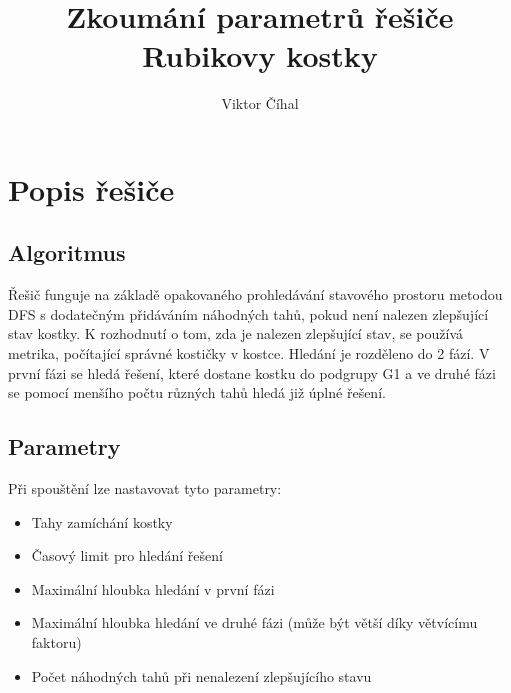 \documentclass{article}
\title{Zkoumání parametrů řešiče Rubikovy kostky}
\author{Viktor Číhal}
\date{}
\begin{document}
\maketitle

\section*{Popis řešiče}
\subsection*{Algoritmus}
Řešič funguje na základě opakovaného prohledávání stavového prostoru metodou DFS s dodatečným přidáváním náhodných tahů, pokud není nalezen zlepšující
stav kostky. K rozhodnutí o tom, zda je nalezen zlepšující stav, se používá metrika, počítající správné kostičky v kostce. 
Hledání je rozděleno do 2 fází. V první fázi se hledá řešení, které dostane kostku do podgrupy G1 a ve druhé fázi se pomocí menšího počtu
různých tahů hledá již úplné řešení.

\subsection*{Parametry}
Při spouštění lze nastavovat tyto parametry:
\begin{itemize}
    \item Tahy zamíchání kostky
    \item Časový limit pro hledání řešení
    \item Maximální hloubka hledání v první fázi
    \item Maximální hloubka hledání ve druhé fázi (může být větší díky větvícímu faktoru)
    \item Počet náhodných tahů při nenalezení zlepšujícího stavu
\end{itemize}
\end{document}
